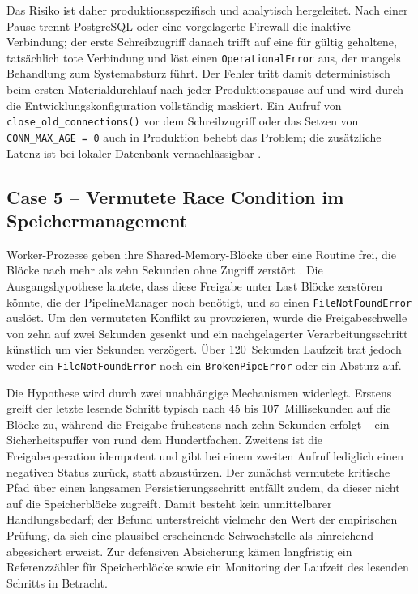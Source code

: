Das Risiko ist daher produktionsspezifisch und analytisch hergeleitet. Nach einer Pause
trennt PostgreSQL oder eine vorgelagerte Firewall die inaktive Verbindung; der erste
Schreibzugriff danach trifft auf eine für gültig gehaltene, tatsächlich tote Verbindung
und löst einen \texttt{OperationalError} aus, der mangels Behandlung zum Systemabsturz
führt. Der Fehler tritt damit deterministisch beim ersten Materialdurchlauf nach jeder
Produktionspause auf und wird durch die Entwicklungskonfiguration vollständig maskiert. Ein Aufruf von
\texttt{close\_old\_connections()} vor dem Schreibzugriff oder das Setzen von
\texttt{CONN\_\allowbreak{}MAX\_\allowbreak{}AGE = 0} auch in Produktion behebt das Problem;
die zusätzliche Latenz ist bei lokaler Datenbank vernachlässigbar
\cite{django_persistent_connections}.

\subsection{Case 5 -- Vermutete Race Condition im Speichermanagement}
\label{sec:case5}

Worker-Prozesse geben ihre Shared-Memory-Blöcke über eine Routine frei, die Blöcke nach
mehr als zehn Sekunden ohne Zugriff zerstört \cite{python_shm}. Die Ausgangshypothese
lautete, dass diese Freigabe unter Last Blöcke zerstören könnte, die der PipelineManager
noch benötigt, und so einen \texttt{FileNotFoundError} auslöst. Um den vermuteten Konflikt
zu provozieren, wurde die Freigabeschwelle von zehn auf zwei Sekunden gesenkt und ein
nachgelagerter Verarbeitungsschritt künstlich um vier Sekunden verzögert. Über 120~Sekunden
Laufzeit trat jedoch weder ein \texttt{FileNotFoundError} noch ein \texttt{BrokenPipeError}
oder ein Absturz auf.

Die Hypothese wird durch zwei unabhängige Mechanismen widerlegt. Erstens greift der letzte
lesende Schritt typisch nach 45 bis 107~Millisekunden auf die Blöcke zu, während die
Freigabe frühestens nach zehn Sekunden erfolgt -- ein Sicherheitspuffer von rund dem
Hundertfachen. Zweitens ist die Freigabeoperation idempotent und gibt bei einem zweiten
Aufruf lediglich einen negativen Status zurück, statt abzustürzen. Der zunächst vermutete
kritische Pfad über einen langsamen Persistierungsschritt entfällt zudem, da dieser nicht
auf die Speicherblöcke zugreift. Damit besteht kein unmittelbarer Handlungsbedarf; der
Befund unterstreicht vielmehr den Wert der empirischen Prüfung, da sich eine plausibel
erscheinende Schwachstelle als hinreichend abgesichert erweist. Zur defensiven Absicherung
kämen langfristig ein Referenzzähler für Speicherblöcke sowie ein Monitoring der Laufzeit
des lesenden Schritts in Betracht.
